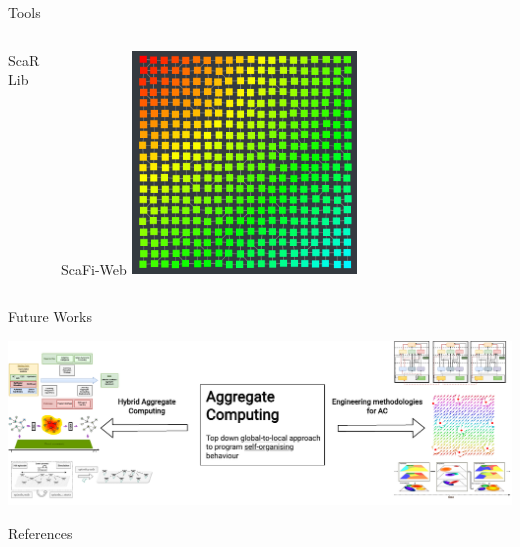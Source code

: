 \documentclass[presentation, 9pt, aspectratio=169]{beamer}\mode<presentation>{\usetheme{AMSBolognaFC}}
\begin{document}
\begin{frame}{Tools}
  \vspace{-0.5cm}
  \begin{columns}[t]
    \begin{column}{0.48\textwidth}
      \begin{exampleblock}{ScaRLib}
      \end{exampleblock}
    \end{column}

    \begin{column}{0.48\textwidth}
      \begin{exampleblock}{ScaFi-Web}
        \centering
        \includegraphics[width=0.5\textwidth]{img/gradient-scafi.png}
      \end{exampleblock}
    \end{column}
  \end{columns}
\end{frame}

\begin{frame}{Future Works}

\end{frame}

\begin{frame}
\includegraphics[width=\textwidth]{img/contribution.drawio.pdf}
\end{frame}
\begin{frame}[allowframebreaks]{References}
  \def\bibfont{\footnotesize}
  \printbibliography
\end{frame}

\end{document}
